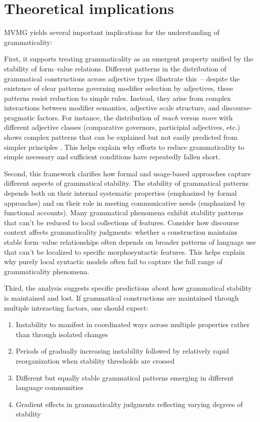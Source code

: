 \documentclass[12pt,letterpaper]{article}
\begin{document}
\section{Theoretical implications}\label{sec:implications}

MVMG yields several important implications for the understanding of grammaticality:

First, it supports treating grammaticality as an emergent property unified by the stability of form--value relations. Different patterns in the distribution of grammatical constructions across adjective types illustrate this~--  despite the existence of clear patterns governing modifier selection by adjectives, these patterns resist reduction to simple rules. Instead, they arise from complex interactions between modifier semantics, adjective scale structure, and discourse-pragmatic factors. For instance, the distribution of \textit{much} versus \textit{more} with different adjective classes (comparative governors, participial adjectives, etc.) shows complex patterns that can be explained but not easily predicted from simpler principles \autocite{reynolds2024why}. This helps explain why efforts to reduce grammaticality to simple necessary and sufficient conditions have repeatedly fallen short.

Second, this framework clarifies how formal and usage-based approaches capture different aspects of grammatical stability. The stability of grammatical patterns depends both on their internal systematic properties (emphasized by formal approaches) and on their role in meeting communicative needs (emphasized by functional accounts). Many grammatical phenomena exhibit stability patterns that can't be reduced to local collections of features. Consider how discourse context affects grammaticality judgments: whether a construction maintains stable form--value relationships often depends on broader patterns of language use that can't be localized to specific morphosyntactic features. This helps explain why purely local syntactic models often fail to capture the full range of grammaticality phenomena.

Third, the analysis suggests specific predictions about how grammatical stability is maintained and lost. If grammatical constructions are maintained through multiple interacting factors, one should expect:
\begin{enumerate}
    \item Instability to manifest in coordinated ways across multiple properties rather than through isolated changes
    \item Periods of gradually increasing instability followed by relatively rapid reorganization when stability thresholds are crossed
    \item Different but equally stable grammatical patterns emerging in different language communities
    \item Gradient effects in grammaticality judgments reflecting varying degrees of stability
\end{enumerate}
\end{document}
